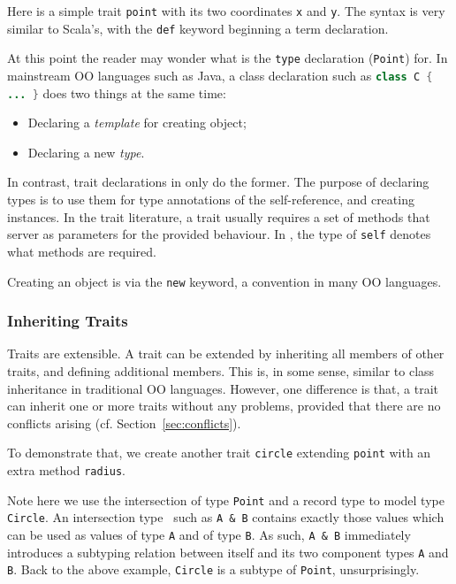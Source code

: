 Here is a simple trait \lstinline{point} with its two coordinates \lstinline{x}
and \lstinline{y}.
The syntax is very similar to Scala's, with the \lstinline{def} keyword
beginning a term declaration.

At this point the reader may wonder what is the \lstinline{type} declaration
(\lstinline$Point$) for. In mainstream OO languages such as Java, a class
declaration such as \lstinline[language=java]$class C { ... }$ does two things
at the same time:

\begin{itemize}
\item Declaring a \textit{template} for creating object;
\item Declaring a new \textit{type}.
\end{itemize}

In contrast, trait declarations in \name only do the former. The purpose of
declaring types is to use them for type annotations of the self-reference, and
creating instances. In the trait literature, a trait usually requires a set of
methods that server as parameters for the provided behaviour. In \name, the type
of \lstinline$self$ denotes what methods are required.

Creating an object is via the \lstinline{new} keyword, a convention in many OO
languages.

\subsubsection{Inheriting Traits}

Traits are extensible. A trait can be extended by inheriting all members of
other traits, and defining additional members. This is, in some sense, similar
to class inheritance in traditional OO languages. However, one difference is
that, a trait can inherit one or more traits without any problems, provided that
there are no conflicts arising (cf. Section~\ref{sec:conflicts}).

To demonstrate that, we create another trait \lstinline$circle$ extending
\lstinline{point} with an extra method \lstinline{radius}.

Note here we use the intersection of type \lstinline{Point} and a record type to
model type \lstinline{Circle}. An intersection
type~\cite{dunfield2014elaborating} such as \lstinline{A & B} contains exactly
those values which can be used as values of type \lstinline{A} and of type
\lstinline{B}. As such, \lstinline{A & B} immediately introduces a subtyping
relation between itself and its two component types \lstinline{A} and
\lstinline{B}. Back to the above example, \lstinline{Circle} is a subtype of
\lstinline{Point}, unsurprisingly.

